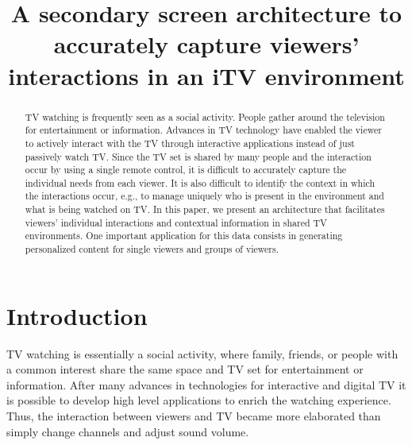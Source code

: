 \documentclass[conference,a4paper]{IEEEtran}
\begin{document}
\title{A secondary screen architecture to accurately capture viewers' interactions in an iTV environment}

\author{
\and
{}
}
\maketitle

\begin{abstract}
TV watching is frequently seen as a social activity. People gather around the television for entertainment or information. Advances in TV technology have enabled the viewer to actively interact with the TV through interactive applications instead of just passively watch TV. Since the TV set is shared by many people and the interaction occur by using a single remote control, it is difficult to accurately capture the individual needs from each viewer. It is also difficult to identify the context in which the interactions occur, e.g., to manage uniquely who is present in the environment and what is being watched on TV. In this paper, we present an architecture that facilitates viewers' individual interactions and contextual information in shared TV environments. One important application for this data consists in generating personalized content for single viewers and groups of viewers.
\end{abstract}

\IEEEpeerreviewmaketitle

\section{Introduction}

TV watching is essentially a social activity, where family, friends, or people with a common interest share the same space and TV set for entertainment or information. After many advances in technologies for interactive and digital TV it is possible to develop high level applications to enrich the watching experience. Thus, the interaction between viewers and TV became more elaborated than simply change channels and adjust sound volume.
\end{document}
